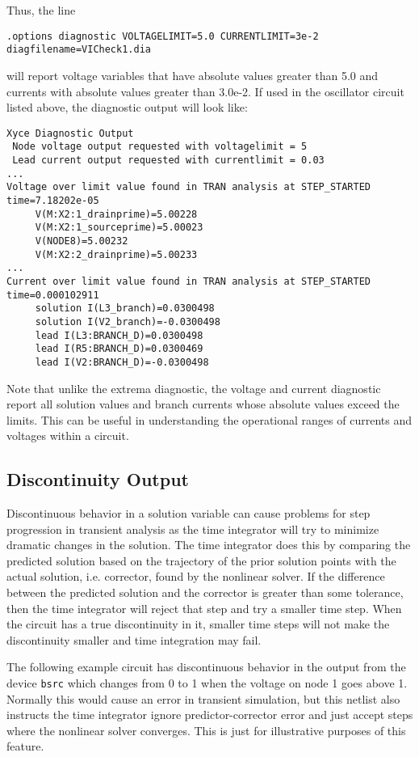 Thus, the line
\begin{verbatim}
.options diagnostic VOLTAGELIMIT=5.0 CURRENTLIMIT=3e-2 diagfilename=VICheck1.dia
\end{verbatim}
will report voltage variables that have absolute values greater than 5.0 and currents
with absolute values greater than 3.0e-2.  If used in the oscillator circuit listed above, 
the diagnostic output will look like:

\begin{verbatim}
Xyce Diagnostic Output
 Node voltage output requested with voltagelimit = 5
 Lead current output requested with currentlimit = 0.03
...
Voltage over limit value found in TRAN analysis at STEP_STARTED time=7.18202e-05
     V(M:X2:1_drainprime)=5.00228
     V(M:X2:1_sourceprime)=5.00023
     V(NODE8)=5.00232
     V(M:X2:2_drainprime)=5.00233
...
Current over limit value found in TRAN analysis at STEP_STARTED time=0.000102911
     solution I(L3_branch)=0.0300498
     solution I(V2_branch)=-0.0300498
     lead I(L3:BRANCH_D)=0.0300498
     lead I(R5:BRANCH_D)=0.0300469
     lead I(V2:BRANCH_D)=-0.0300498
\end{verbatim}

Note that unlike the extrema diagnostic, the voltage and current diagnostic report all 
solution values and branch currents whose absolute values exceed the limits.  This can
be useful in understanding the operational ranges of currents and voltages within a circuit.

\subsection{Discontinuity Output}
Discontinuous behavior in a solution variable can cause problems for step progression 
in transient analysis as the time integrator will try to minimize dramatic changes 
in the solution.  The time integrator does this by comparing the predicted solution 
based on the trajectory of the prior solution points with the actual solution, i.e. corrector, 
found by the nonlinear solver.  If the difference between the predicted solution and the corrector 
is greater than some tolerance, then the time integrator
will reject that step and try a smaller time step.  When the circuit has a true 
discontinuity in it, smaller time steps will not make the discontinuity smaller and 
time integration may fail.

The following example circuit has discontinuous behavior in the output from 
the device \texttt{bsrc} which changes from 0 to 1 when the voltage on node 1 goes 
above 1.  Normally this would cause an error in transient simulation, but this netlist
also instructs the time integrator ignore predictor-corrector error and just 
accept steps where the nonlinear solver converges.  This is just for illustrative 
purposes of this feature.  

